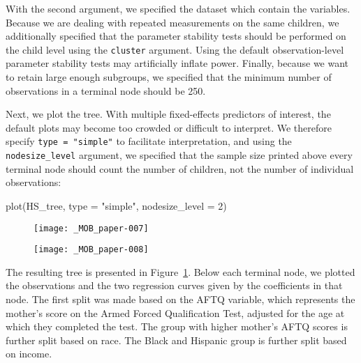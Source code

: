 \documentclass[doc,floatsintext,natbib]{apa7}
\begin{document}
With the second argument, we specified the dataset which contain the variables. Because we are dealing with repeated measurements on the same children, we additionally specified that the parameter stability tests should be performed on the child level using the \verb|cluster| argument. Using the default observation-level parameter stability tests may artificially inflate power. Finally, because we want to retain large enough subgroups, we specified that the minimum number of observations in a terminal node should be 250.

Next, we plot the tree. With multiple fixed-effects predictors of interest, the default plots may become too crowded or difficult to interpret. We therefore specify \verb|type = "simple"| to facilitate interpretation, and using the \verb|nodesize_level| argument, we specified that the sample size printed above every terminal node should count the number of children, not the number of individual observations:

\begin{Schunk}
\begin{Sinput}
 plot(HS_tree, type = "simple", nodesize_level = 2)
\end{Sinput}
\end{Schunk}

\begin{figure}%
\caption{}
\texttt{[image: \_MOB\_paper-007]}

\vspace*{-3cm}

\texttt{[image: \_MOB\_paper-008]}
\label{fig:lmm_tree}
\end{figure}%

The resulting tree is presented in Figure~\ref{fig:lmm_tree}. Below each terminal node, we plotted the observations and the two regression curves given by the coefficients in that node. The first split was made based on the AFTQ variable, which represents the mother's score on the Armed Forced Qualification Test, adjusted for the age at which they completed the test. The group with higher mother's AFTQ scores is further split based on race. The Black and Hispanic group is further split based on income. 
\end{document}

